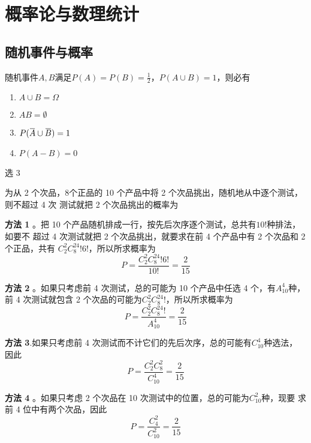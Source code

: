 \documentclass{article}
\begin{document}
\section{概率论与数理统计}
\label{sec:org84f3313}
\subsection{随机事件与概率}
\label{sec:org40acab3}
\begin{examplle}[]
随机事件\(A,B\)满足\(P(A)=P(B)=\frac{1}{2}\)，\(P(A\cup B)=1\)，则必有
\begin{enumerate}
\item \(A\cup B=\Omega\)
\item \(AB=\emptyset\)
\item \(P(\bbar{A}\cup\bbar{B})=1\)
\item \(P(A-B)=0\)
\end{enumerate}


选 3
\end{examplle}

\begin{examplle}[]
为从 2 个次品，8个正品的 10 个产品中将 2 个次品挑出，随机地从中逐个测试，则不超过 4 次
测试就把 2 个次品挑出的概率为

\textbf{方法 1} 。把 10 个产品随机排成一行，按先后次序逐个测试，总共有\(10!\)种排法，如要不
 超过 4 次测试就把 2 个次品挑出，就要求在前 4 个产品中有 2 个次品和 2 个正品，共有
 \(C_2^2C_8^24!6!\)，所以所求概率为
\begin{equation*}
P=\frac{C_2^2C_8^24!6!}{10!}=\frac{2}{15}
\end{equation*}

\textbf{方法 2} 。如果只考虑前 4 次测试，总的可能为 10 个产品中任选 4 个，有\(A_{10}^4\)种，前
 4 次测试就包含 2 个次品的可能为\(C_2^2C_8^24!\)，所以所求概率为
\begin{equation*}
P=\frac{C_2^2C_8^24!}{A_{10}^4}=\frac{2}{15}
\end{equation*}

\textbf{方法 3}.如果只考虑前 4 次测试而不计它们的先后次序，总的可能有\(C_{10}^4\)种选法，
 因此
\begin{equation*}
P=\frac{C_2^2C_8^2}{C_{10}^4}=\frac{2}{15}
\end{equation*}

\textbf{方法 4} 。如果只考虑 2 个次品在 10 次测试中的位置，总的可能为\(C_{10}^2\)种，现要
 求前 4 位中有两个次品，因此
\begin{equation*}
P=\frac{C_4^2}{C_{10}^2}=\frac{2}{15}
\end{equation*}
\end{examplle}
\end{document}
